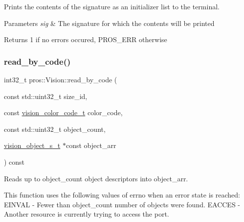Prints the contents of the signature as an initializer list to the terminal. 


\begin{DoxyParams}{Parameters}
{\em sig} & The signature for which the contents will be printed\\
\hline
\end{DoxyParams}
\begin{DoxyReturn}{Returns}
1 if no errors occured, P\+R\+O\+S\+\_\+\+E\+RR otherwise 
\end{DoxyReturn}
\mbox{\label{classpros_1_1Vision_afbe909146f5cf396b322467885731d04}} 
\subsubsection{\texorpdfstring{read\_by\_code()}{read\_by\_code()}}
{\footnotesize\ttfamily int32\+\_\+t pros\+::\+Vision\+::read\+\_\+by\+\_\+code (\begin{DoxyParamCaption}\item[{const std\+::uint32\+\_\+t}]{size\+\_\+id,  }\item[{const \mbox{\hyperlink{vision_8h_a71f2011a47e95558bb534b05c16c7f2b}{vision\+\_\+color\+\_\+code\+\_\+t}}}]{color\+\_\+code,  }\item[{const std\+::uint32\+\_\+t}]{object\+\_\+count,  }\item[{\mbox{\hyperlink{vision_8h_ae619120558539c13e53b5a6f42fb4375}{vision\+\_\+object\+\_\+s\+\_\+t}} $\ast$const}]{object\+\_\+arr }\end{DoxyParamCaption}) const}



Reads up to object\+\_\+count object descriptors into object\+\_\+arr. 

This function uses the following values of errno when an error state is reached\+: E\+I\+N\+V\+AL -\/ Fewer than object\+\_\+count number of objects were found. E\+A\+C\+C\+ES -\/ Another resource is currently trying to access the port.


